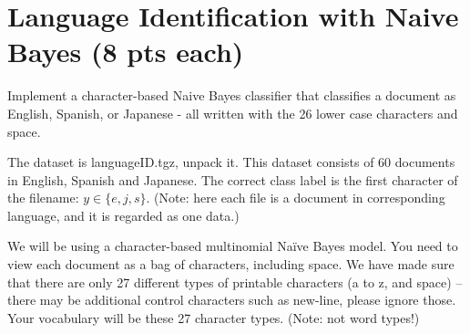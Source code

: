 \documentclass[a4paper]{article}
\theoremstyle{definition}
\begin{document}
\section{Language Identification with Naive Bayes (8 pts each)}
Implement a character-based Naive Bayes classifier that classifies a document as English, Spanish, or Japanese - all written with the 26 lower case characters and space.

The dataset is languageID.tgz, unpack it.
This dataset consists of 60 documents in English, Spanish and Japanese.
The correct class label is the first character of the filename: $y \in \{e, j, s\}$. (Note: here each file is a document in corresponding language, and it is regarded as one data.)

We will be using a character-based multinomial Naïve Bayes model.  You need to view each document as a bag of characters, including space.  We have made sure that there are only 27 different types of printable characters (a to z, and space) -- there may be additional control characters such as new-line, please ignore those.  Your vocabulary will be these 27 character types. (Note: not word types!)
\end{document}
